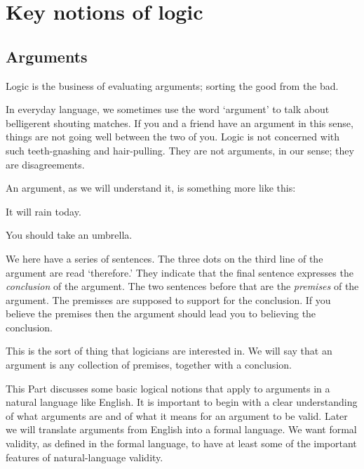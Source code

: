 \part{Key notions of logic}
\label{ch.intro}


\chapter{Arguments}
\label{s:Arguments}

Logic is the business of evaluating arguments; sorting the good from the bad. 

In everyday language, we sometimes use the word `argument' to talk about belligerent shouting matches.  If you and a friend have an argument in this sense, things are not going well between the two of you. Logic is not concerned with such teeth-gnashing and hair-pulling. They are not arguments, in our sense; they are disagreements.

An argument, as we will understand it, is something more like this:
	\begin{earg}\label{argRaining}
		\item[] It will rain today.
		\item[\therefore] You should take an umbrella.
	\end{earg}
We here have a series of sentences. The three dots on the third line of the argument are read `therefore.' They indicate that the final sentence expresses the \emph{conclusion} of the argument. The two sentences before that are the \emph{premises} of the argument. The premisses are supposed to support for the conclusion. If you believe the premises then the argument should lead you to believing the conclusion.



This is the sort of thing that logicians are interested in. We will say that an argument is any collection of premises, together with a conclusion. 

This Part discusses some basic logical notions that apply to arguments in a natural language like English. It is important to begin with a clear understanding of what arguments are and of what it means for an argument to be valid. Later we will translate arguments from English into a formal language. We want formal validity, as defined in the formal language, to have at least some of the important features of natural-language validity. 





